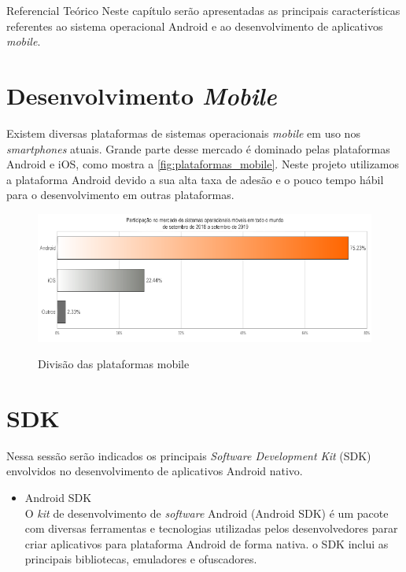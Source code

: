 \documentclass[
	12pt,				%
	openany,			%
	twoside,			%
	a4paper,			%
	english,			%
	french,				%
	spanish,			%
	brazil				%
	]{abntex2}
\begin{document}
\begin{chapter}{Referencial Teórico}
Neste capítulo serão apresentadas as principais características referentes ao sistema operacional Android e ao desenvolvimento de aplicativos \textit{mobile}.
\section{Desenvolvimento \textit{Mobile}}
Existem diversas plataformas de sistemas operacionais \textit{mobile} em uso nos \textit{smartphones} atuais. Grande parte desse mercado é dominado pelas plataformas Android e iOS, como mostra a \autoref{fig:plataformas_mobile}. Neste projeto utilizamos a plataforma Android devido a sua alta taxa de adesão e o pouco tempo hábil para o desenvolvimento em outras plataformas.

\begin{figure}[h]
\centering
   \caption{Divisão das plataformas mobile}
   \includegraphics[scale=0.85]{media/grafico_plataformas2.png}
     \label{fig:plataformas_mobile}
\end{figure}

\newpage
\section{SDK}
Nessa sessão serão indicados os principais \textit{Software Development Kit} (SDK) envolvidos no desenvolvimento de aplicativos Android nativo.

\begin{itemize}
\item{Android SDK} \\
O \textit{kit} de desenvolvimento de \textit{software} Android (Android SDK) é um pacote com diversas ferramentas e tecnologias utilizadas pelos desenvolvedores parar criar aplicativos para plataforma Android de forma nativa. o SDK inclui as principais bibliotecas, emuladores e ofuscadores.
  

\end{itemize}
\end{chapter}
\end{document}
